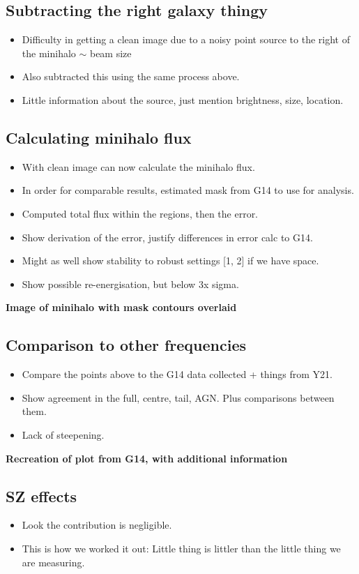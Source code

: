 \documentclass{pas}
\begin{document}
\subsection{Subtracting the right galaxy thingy}
\begin{itemize}
  \item Difficulty in getting a clean image due to a noisy point source to the right of the minihalo $\sim$ beam size
  \item Also subtracted this using the same process above.
  \item Little information about the source, just mention brightness, size, location.
\end{itemize}

\subsection{Calculating minihalo flux}

\begin{itemize}
  \item With clean image can now calculate the minihalo flux.
  \item In order for comparable results, estimated mask from G14 to use for analysis.
  \item Computed total flux within the regions, then the error. 
  \item Show derivation of the error, justify differences in error calc to G14.
  \item Might as well show stability to robust settings [1, 2] if we have space.
  \item Show possible re-energisation, but below 3x sigma. 
\end{itemize}
\textbf{Image of minihalo with mask contours overlaid}

\subsection{Comparison to other frequencies}
\begin{itemize}
  \item Compare the points above to the G14 data collected + things from Y21.
  \item Show agreement in the full, centre, tail, AGN. Plus comparisons between them.
  \item Lack of steepening.
\end{itemize}
\textbf{Recreation of plot from G14, with additional information}

\subsection{SZ effects}
\begin{itemize}
  \item Look the contribution is negligible.
  \item This is how we worked it out: Little thing is littler than the little thing we are measuring.
\end{itemize}
\end{document}
